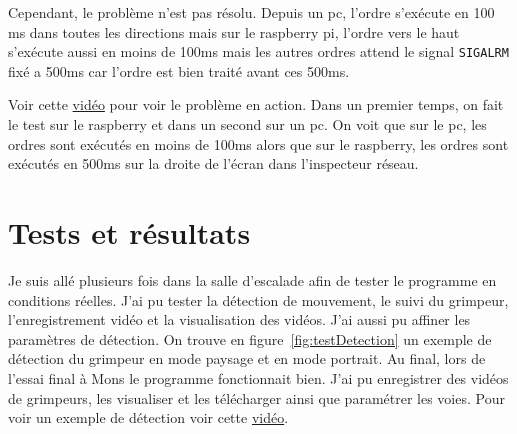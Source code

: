 \documentclass[a4paper, 11pt, french]{article}
\begin{document}
Cependant, le problème n'est pas résolu. Depuis un pc, l'ordre s’exécute en 100 ms dans toutes les directions mais sur le raspberry pi, l'ordre vers le haut s'exécute aussi en moins de 100ms mais les autres ordres attend le signal \texttt{SIGALRM} fixé a 500ms car l'ordre est bien traité avant ces 500ms. 

Voir cette \href{https://youtu.be/0Z2cE6WyGWY}{vidéo} pour voir le problème en action. Dans un premier temps, on fait le test sur le raspberry et dans un second sur un pc. On voit que sur le pc, les ordres sont exécutés en moins de 100ms alors que sur le raspberry, les ordres sont exécutés en 500ms sur la droite de l'écran dans l'inspecteur réseau.


\section{Tests et résultats}
Je suis allé plusieurs fois dans la salle d'escalade afin de tester le programme en conditions réelles. J'ai pu tester la détection de mouvement, le suivi du grimpeur, l'enregistrement vidéo et la visualisation des vidéos. J'ai aussi pu affiner les paramètres de détection. On trouve en figure~\ref{fig:testDetection} un exemple de détection du grimpeur en mode paysage et en mode portrait. Au final, lors de l'essai final à Mons le programme fonctionnait bien. J'ai pu enregistrer des vidéos de grimpeurs, les visualiser et les télécharger ainsi que paramétrer les voies. Pour voir un exemple de détection voir cette \href{https://youtu.be/jRj4fich-2w}{vidéo}.
\end{document}
